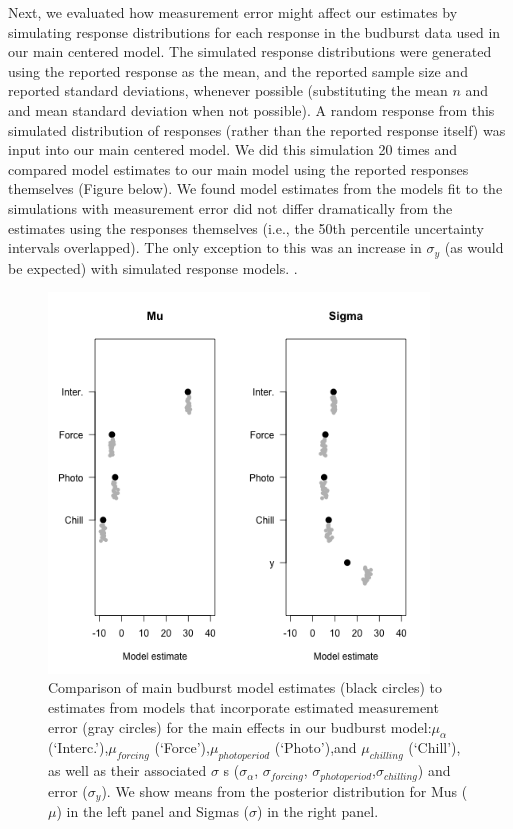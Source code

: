 \documentclass{article}
\begin{document}
Next, we evaluated how measurement error might affect our estimates by simulating response distributions for each response in the budburst data used in our main centered model. The simulated response distributions were generated using the reported response as the mean, and the reported sample size and reported standard deviations, whenever possible (substituting the mean $n$ and and mean standard deviation when not possible). A random response from this simulated distribution of responses (rather than the reported response itself) was input into our main centered model. We did this simulation 20 times and compared model estimates to our main model using the reported responses themselves (Figure below). We found model estimates from the models fit to the simulations with measurement error did not differ dramatically from the estimates using the responses themselves (i.e., the 50th percentile uncertainty intervals overlapped). The only exception to this was an increase in $\sigma_{y}$ (as would be expected) with simulated response models. .\\
\begin{figure}[h!]
\centering
\noindent \includegraphics[width=0.9\textwidth]{..//..//..//..//analyses/bb_analysis/figures/measerrcomp.png}
\caption{Comparison of main budburst model estimates (black circles) to estimates from models that incorporate estimated measurement error (gray circles) for the main effects in our budburst model:$\mu_{\alpha}$ (`Interc.'),$\mu_{forcing}$ (`Force'),$\mu_{photoperiod}$ (`Photo'),and $\mu_{chilling}$ (`Chill'), as well as their associated $\sigma$ s ($\sigma_{\alpha}$, $\sigma_{forcing}$, $\sigma_{photoperiod}$,$\sigma_{chilling}$) and error ($\sigma_{y}$). We show means from the posterior distribution for Mus ($\mu$) in the left panel and Sigmas ($\sigma$) in the right panel.}
\label{fig:trtmap}
\end{figure}
\end{document}
